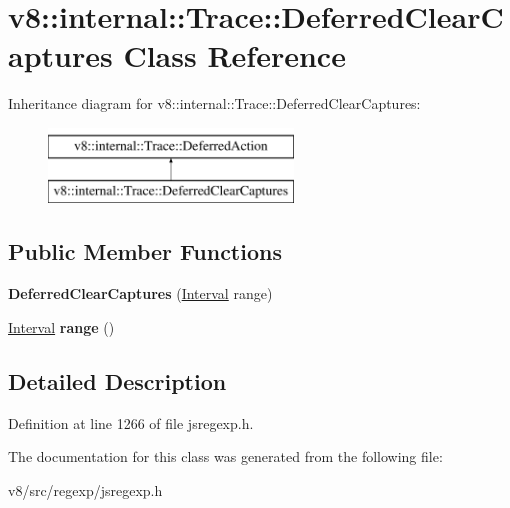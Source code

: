 \hypertarget{classv8_1_1internal_1_1Trace_1_1DeferredClearCaptures}{}\section{v8\+:\+:internal\+:\+:Trace\+:\+:Deferred\+Clear\+Captures Class Reference}
\label{classv8_1_1internal_1_1Trace_1_1DeferredClearCaptures}
Inheritance diagram for v8\+:\+:internal\+:\+:Trace\+:\+:Deferred\+Clear\+Captures\+:\begin{figure}[H]
\begin{center}
\leavevmode
\includegraphics[height=2.000000cm]{classv8_1_1internal_1_1Trace_1_1DeferredClearCaptures}
\end{center}
\end{figure}
\subsection*{Public Member Functions}
\begin{DoxyCompactItemize}
\item 
\mbox{\label{classv8_1_1internal_1_1Trace_1_1DeferredClearCaptures_a1449af3c613a25426e4dd99d5ee496d4}} 
{\bfseries Deferred\+Clear\+Captures} (\mbox{\hyperlink{classv8_1_1internal_1_1Interval}{Interval}} range)
\item 
\mbox{\label{classv8_1_1internal_1_1Trace_1_1DeferredClearCaptures_a195b6197459bcdc53ecc6b8f3818bbd4}} 
\mbox{\hyperlink{classv8_1_1internal_1_1Interval}{Interval}} {\bfseries range} ()
\end{DoxyCompactItemize}


\subsection{Detailed Description}


Definition at line 1266 of file jsregexp.\+h.



The documentation for this class was generated from the following file\+:\begin{DoxyCompactItemize}
\item 
v8/src/regexp/jsregexp.\+h\end{DoxyCompactItemize}
